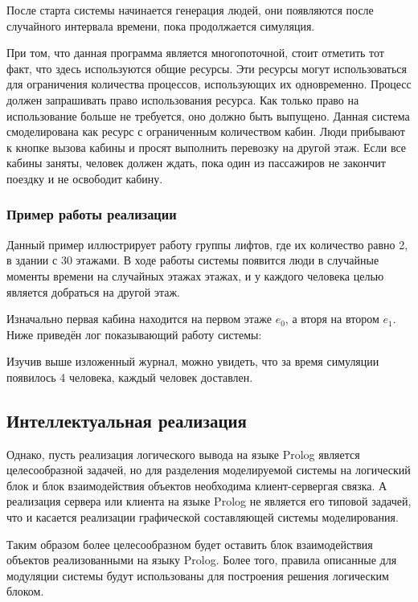			После старта системы начинается генерация людей, они появляются после случайного интервала времени,
			пока продолжается симуляция.


			При том, что данная программа является многопоточной, стоит отметить тот факт, что здесь используются общие ресурсы.
				Эти ресурсы могут использоваться для ограничения количества процессов, использующих их одновременно.
				Процесс должен запрашивать право использования ресурса. Как только право на использование больше не требуется,
				оно должно быть выпущено. Данная система смоделирована как ресурс с ограниченным количеством кабин.
				Люди прибывают к кнопке вызова кабины и просят выполнить перевозку на другой этаж.
				Если все кабины заняты, человек должен ждать, пока один из пассажиров не закончит поездку и не освободит кабину.

				\subsubsection{Пример работы реализации}

			Данный пример иллюстрирует работу группы лифтов, где их количество равно 2, в здании с 30 этажами.
				В ходе работы системы появится люди в случайные моменты времени на случайных этажах этажах,
				и у каждого человека целью является добраться на другой этаж.

			Изначально первая кабина находится на первом этаже $e_0$, а вторя на втором $e_1$.
				Ниже приведён лог показывающий работу системы:

			Изучив выше изложенный журнал, можно увидеть, что за время симуляции появилось 4 человека,
				каждый человек доставлен.

		\subsection{Интеллектуальная реализация}

		Однако, пусть реализация логического вывода на языке Prolog является целесообразной задачей, но для разделения моделируемой системы на логический блок и блок взаимодействия объектов необходима клиент-сервергая связка. А реализация сервера или клиента на языке Prolog не является его типовой задачей, что и касается реализации графической составляющей системы моделирования.

			Таким образом более целесообразном будет оставить блок взаимодействия объектов реализованными на языку Prolog.
				Более того, правила описанные для модуляции системы будут использованы
				для построения решения логическим блоком.

